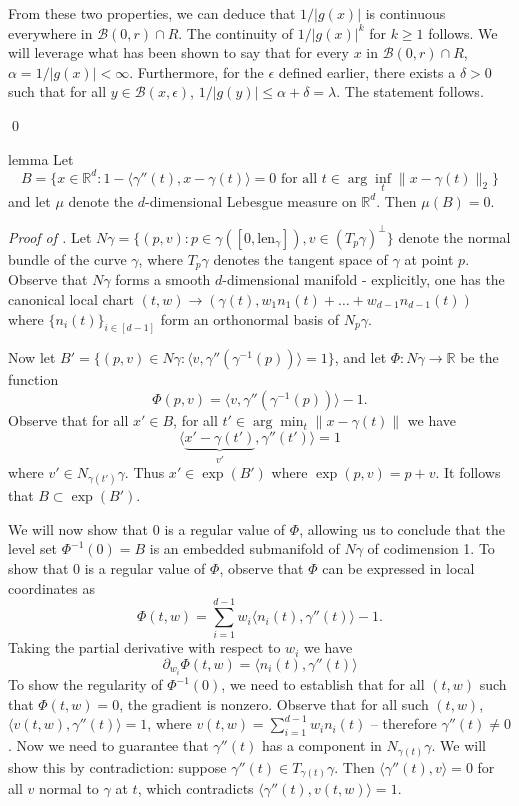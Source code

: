 \documentclass[11pt]{article}
\begin{document}
From these two properties, we can deduce that $1/|g(x)|$ is continuous everywhere in $\mathcal{B}(0,r) \cap R$. The continuity of $1/|g(x)|^k$ for $k\geq 1$ follows. We will leverage what has been shown to say that for every $x$ in $\mathcal{B}(0,r) \cap R$, $\alpha = 1/|g(x)| <\infty$. Furthermore, for the $\epsilon$ defined earlier, there exists a $\delta>0$ such that for all $y \in \mathcal{B}(x, \epsilon)$, $1/|g(y)| \leq \alpha+\delta = \lambda.$ The statement follows.

\qed{}

\begin{restatable}{lemma}{} \label{lemma: IFT degen}
    Let 
    \begin{equation} 
    B= \{x \in \mathbb{R}^d : 1 - \langle\gamma''(t), x-\gamma(t)\rangle = 0 \text{ for all }t \in \arg\inf_t \|x-\gamma(t)\|_2\} \label{eq: ift degeneracy set}
    \end{equation}
    and let $\mu$ denote the $d$-dimensional Lebesgue measure on $\mathbb{R}^d$. Then $\mu(B) = 0.$
\end{restatable}
\noindent \textit{Proof of .} Let $N\gamma = \{(p, v) : p \in \gamma([0, \text{len}_{\gamma}]), v \in (T_p \gamma)^{\bot}\}$ denote the normal bundle of the curve $\gamma$, where $T_p\gamma$ denotes the tangent space of $\gamma$ at point $p$. Observe that $N\gamma$ forms a smooth $d$-dimensional manifold - explicitly, one has the canonical local chart $(t,w) \rightarrow (\gamma(t), w_1n_1(t) + \dots+w_{d-1}n_{d-1}(t))$ where $\{n_i(t)\}_{i\in [d-1]}$ form an orthonormal basis of $N_p\gamma$. 

Now let $B'= \{(p,v) \in N\gamma : \langle v,  \gamma''(\gamma^{-1}(p))\rangle = 1\}$, and let $\Phi:N\gamma \rightarrow \mathbb{R}$ be the function
\[\Phi(p,v) = \langle v, \gamma''(\gamma^{-1}(p))\rangle - 1.\]
Observe that for all $x' \in B$, for all $t' \in \arg\min_t \|x-\gamma(t)\|$ we have \[\langle \underbrace{x' - \gamma(t')}_{v'}, \gamma''(t')\rangle = 1\] where $v' \in N_{\gamma(t')}\gamma$. Thus $x' \in \exp(B')$ where $\exp(p,v) = p + v$. It follows that $B\subset \exp(B')$.

We will now show that $0$ is a regular value of $\Phi$, allowing us to conclude that the level set $\Phi^{-1}(0) = B$ is an embedded submanifold of $N\gamma$ of codimension 1. To show that $0$ is a regular value of $\Phi$, observe that $\Phi$ can be expressed in local coordinates as
\[\Phi(t,w) = \sum_{i = 1}^{d-1}w_i\langle n_i(t), \gamma''(t)\rangle - 1.\]
Taking the partial derivative with respect to $w_i$ we have
\[\partial_{w_i}\Phi(t,w) = \langle n_i(t), \gamma''(t)\rangle\]
To show the regularity of $\Phi^{-1}(0)$, we need to establish that for all $(t,w)$ such that $\Phi(t,w) = 0$, the gradient is nonzero. Observe that for all such $(t,w)$, $\langle v(t,w), \gamma''(t)\rangle = 1$, where $v(t,w) = \sum_{i = 1}^{d-1}w_in_{i}(t)$ -- therefore $\gamma''(t) \neq 0$. Now we need to guarantee that $\gamma''(t)$ has a component in $N_{\gamma(t)}\gamma$. We will show this by contradiction: suppose $\gamma''(t) \in T_{\gamma(t)}\gamma$. Then $\langle\gamma''(t), v\rangle = 0$ for all $v$ normal to $\gamma$ at $t$, which contradicts $\langle \gamma''(t), v(t,w) \rangle = 1$.
\end{document}
